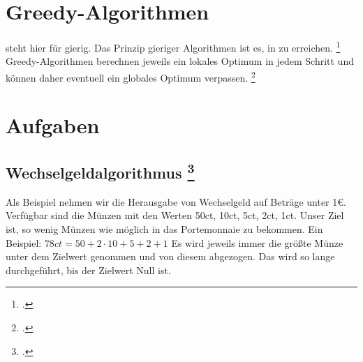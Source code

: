 \documentclass{lehramt-informatik}
\begin{document}

\chapter{Greedy-Algorithmen}

\begin{quellen}
\item \cite[Seite 207-235 (PDF 225-253)]{saake}
\item \cite[Seite 5-6]{aud:fs:3}
\item \cite{wiki:greedy-algorithmus}
\end{quellen}

 steht hier für gierig. Das Prinzip gieriger Algorithmen
ist es, in  zu erreichen.
\footcite[Seite 213 (PDF 231)]{saake}
Greedy-Algorithmen berechnen jeweils ein lokales Optimum in jedem Schritt
und können daher eventuell ein globales Optimum verpassen.
\footcite[Seite 214 (PDF 232)]{saake}


\chapter{Aufgaben}

%

\section{Wechselgeldalgorithmus
\footcite{net:html:wikiversity:wechselgeld}}

Als Beispiel nehmen wir die Herausgabe von Wechselgeld auf Beträge unter
1€. Verfügbar sind die Münzen mit den Werten 50ct, 10ct, 5ct, 2ct, 1ct.
Unser Ziel ist, so wenig Münzen wie möglich in das Portemonnaie zu
bekommen.
%
Ein Beispiel: $78ct = 50 + 2 \cdot 10 + 5 + 2 + 1$
%
Es wird jeweils immer die größte Münze unter dem Zielwert genommen und
von diesem abgezogen. Das wird so lange durchgeführt, bis der Zielwert
Null ist.

%
\end{document}
